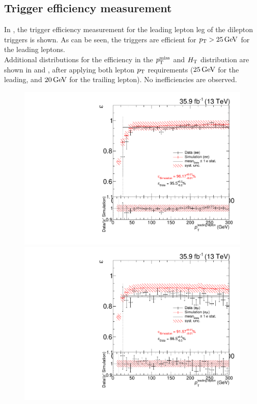 \subsection*{Trigger efficiency measurement}\label{sec:app_trigger}
In , the trigger efficiency measurement for the leading lepton leg of the dilepton triggers is shown. As can be seen, the triggers are efficient for $p_{\mathrm{T}}>25\,\text{Ge\hspace{-.08em}V}$ for the leading leptons.\\
Additional distributions for the efficiency in the $p_{\mathrm{T}}^\text{miss}$ and $H_{\mathrm{T}}$ distribution are shown in  and , after applying both lepton $p_{\mathrm{T}}$ requirements ($25\,\text{Ge\hspace{-.08em}V}$ for the leading, and $20\,\text{Ge\hspace{-.08em}V}$ for the trailing lepton). No inefficiencies are observed.
\begin{figure}[htb]
 \centering
 \includegraphics[width=\pairwidth]{figures/triggerStudies/efficiency_dataHT_trigDilep_EE_pt1}
 \includegraphics[width=\pairwidth]{figures/triggerStudies/efficiency_dataHT_trigDilep_EM_pt1}

\end{figure}
